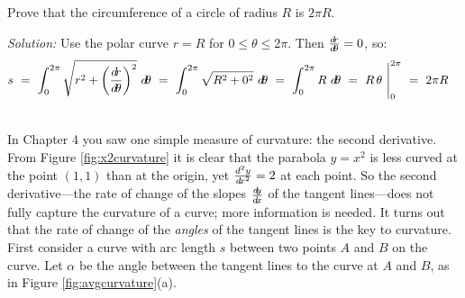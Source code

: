 \newpage
\begin{exmp}
\noindent Prove that the circumference of a circle of radius $R$ is
$2\pi R$.\vspace{1mm}
\par\noindent\emph{Solution:} Use the polar curve $r=R$ for
$0\le\theta\le 2\pi$. Then $\frac{d\!r}{d\!\theta}=0$, so:
\[
s ~=~ \int_0^{2\pi} \sqrt{r^2 + \left(\frac{d\!r}{d\!\theta}\right)^2}~d\!\theta
  ~=~ \int_0^{2\pi} \sqrt{R^2 + 0^2}~d\!\theta ~=~ \int_0^{2\pi} R~d\!\theta
  ~=~ R\,\theta~\Biggr|_0^{2\pi} ~=~ 2\pi R \quad\relax
\]
\end{exmp}
\divider
\vspace{2mm}

\par{}\\
\piccaption[]{\label{fig:x2curvature}}
In Chapter 4 you saw one simple measure of curvature: the second derivative.
From Figure \ref{fig:x2curvature} it is clear that the parabola $y=x^2$ is less
curved at the point $(1,1)$ than at the origin, yet $\frac{d^2y}{d\!x^2}=2$ at
each point. So the second derivative---the rate of change of the slopes $\frac{d\negmedspace y}{d\!x}$
of the tangent lines---does not fully capture the curvature of a curve; more
information is needed. It turns out that the rate of change of the \emph{angles}
of the tangent lines is the key to curvature.
First consider a curve with arc length $s$ between two points $A$ and $B$ on the
curve. Let $\alpha$ be the angle between the tangent lines to the curve at $A$
and $B$, as in Figure \ref{fig:avgcurvature}(a).

